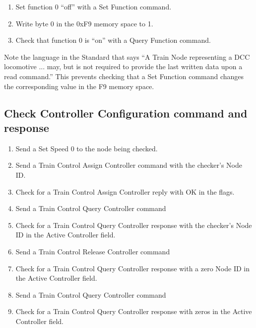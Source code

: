 \begin{enumerate}

    \item Set function 0 ``off'' with a Set Function command.

    \item Write byte 0 in the 0xF9 memory space to 1.

    \item Check that function 0 is ``on'' with a Query Function command.

\end{enumerate}

Note the language in the Standard that says 
``A Train Node representing a DCC locomotive ... may, 
but is not required to provide the last written data upon a read command.''
This prevents checking that a Set Function command changes the corresponding
value in the F9 memory space.


\subsection{Check Controller Configuration command and response}

\begin{enumerate}

    \item Send a Set Speed 0 to the node being checked.
    
    \item Send a Train Control Assign Controller command with the checker's Node ID.
    \item Check for a Train Control Assign Controller reply with OK in the flags.

    \item Send a Train Control Query Controller command
    \item Check for a Train Control Query Controller response with the checker's Node ID
        in the Active Controller field.

    \item Send a Train Control Release Controller command
    \item Check for a Train Control Query Controller response with a zero Node ID
        in the Active Controller field.

    \item Send a Train Control Query Controller command
    \item Check for a Train Control Query Controller response with zeros
        in the Active Controller field.

\end{enumerate}

